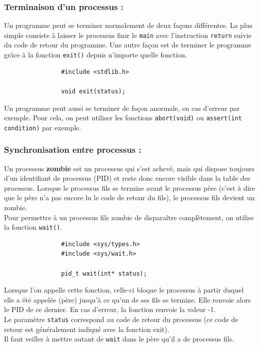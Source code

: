 		\subsubsection{Terminaison d'un processus :}
			Un programme peut se terminer normalement de deux façons différentes. La plus simple consiste à laisser le processus finir le \lstinline!main! avec l'instruction \lstinline!return! suivie du code de retour du programme. Une autre façon est de terminer le programme grâce à la fonction \lstinline!exit()! depuis n'importe quelle fonction.
			\begin{lstlisting}
				#include <stdlib.h>

				void exit(status);
			\end{lstlisting}
			Un programme peut aussi se terminer de façon anormale, en cas d'erreur par exemple. Pour cela, on peut utiliser les fonctions \lstinline!abort(void)! ou \lstinline!assert(int condition)! par exemple. 
			
			
		\subsubsection{Synchronisation entre processus :}
			Un processus \textbf{zombie} est un processus qui s'est achevé, mais qui dispose toujours d'un identifiant de processus (PID) et reste donc encore visible dans la table des processus. Lorsque le processus fils se termine avant le processus père (c'est à dire que le père n'a pas encore lu le code de retour du fils), le processus fils devient un zombie.\\
			
			Pour permettre à un processus fils zombie de disparaître complètement, on utilise la fonction \lstinline!wait()!.
			\begin{lstlisting}
				#include <sys/types.h>
				#include <sys/wait.h>

				pid_t wait(int* status);
			\end{lstlisting}
			Lorsque l'on appelle cette fonction, celle-ci bloque le processus à partir duquel elle a été appelée (père) jusqu'à ce qu'un de ses fils se termine. Elle renvoie alors le PID de ce dernier. En cas d'erreur, la fonction renvoie la valeur -1.\\
			Le paramètre \lstinline!status! correspond au code de retour du processus (ce code de retour est généralement indiqué avec la fonction exit).\\
			Il faut veiller à mettre autant de \lstinline!wait! dans le père qu'il a de processus fils.\\
			
